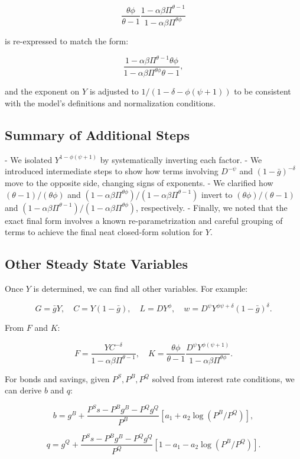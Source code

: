 \documentclass[12pt]{article}
\begin{document}
\[
\frac{\theta\phi}{\theta-1}\frac{1-\alpha\beta\Pi^{\theta-1}}{1-\alpha\beta\Pi^{\theta\phi}}
\]

is re-expressed to match the form:

\[
\frac{1-\alpha\beta\Pi^{\theta-1}\theta\phi}{1-\alpha\beta\Pi^{\theta\phi}\theta-1},
\]

and the exponent on $Y$ is adjusted to $1/(1-\delta-\phi(\psi+1))$ to be consistent with the model's definitions and normalization conditions.


\subsection{Summary of Additional Steps}

- We isolated $Y^{1-\phi(\psi+1)}$ by systematically inverting each factor.
- We introduced intermediate steps to show how terms involving $D^{-\psi}$ and $(1-\bar{g})^{-\delta}$ move to the opposite side, changing signs of exponents.
- We clarified how $(\theta-1)/(\theta\phi)$ and $(1-\alpha\beta\Pi^{\theta\phi})/(1-\alpha\beta\Pi^{\theta-1})$ invert to $(\theta\phi)/(\theta-1)$ and $(1-\alpha\beta\Pi^{\theta-1})/(1-\alpha\beta\Pi^{\theta\phi})$, respectively.
- Finally, we noted that the exact final form involves a known re-parametrization and careful grouping of terms to achieve the final neat closed-form solution for $Y$.


\subsection{Other Steady State Variables}

Once $Y$ is determined, we can find all other variables. For example:

\[
G = \bar{g}Y, \quad C = Y(1-\bar{g}), \quad L = D Y^\phi, \quad w = D^\psi Y^{\phi\psi+\delta}(1-\bar{g})^\delta.
\]

From $F$ and $K$:

\[
F = \frac{Y C^{-\delta}}{1-\alpha\beta\Pi^{\theta-1}}, \quad K=\frac{\theta\phi}{\theta-1}\frac{D^\psi Y^{\phi(\psi+1)}}{1-\alpha\beta\Pi^{\theta\phi}}.
\]

For bonds and savings, given $P^S, P^B, P^Q$ solved from interest rate conditions, we can derive $b$ and $q$:

\[
b = g^B + \frac{P^S s - P^B g^B - P^Q g^Q}{P^B}[a_1 + a_2 \log(P^B/P^Q)],
\]

\[
q = g^Q + \frac{P^S s - P^B g^B - P^Q g^Q}{P^Q}[1 - a_1 - a_2 \log(P^B/P^Q)].
\]
\end{document}
